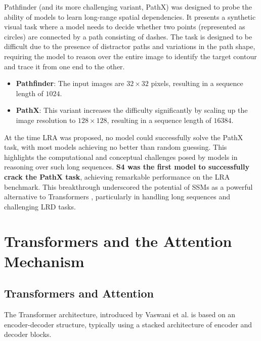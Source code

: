 \documentclass[12pt,a4paper]{report}
\begin{document}
Pathfinder (and its more challenging variant, PathX) was designed to probe the ability of models to learn long-range spatial dependencies. It presents a synthetic visual task where a model needs to decide whether two points (represented as circles) are connected by a path consisting of dashes. The task is designed to be difficult due to the presence of distractor paths and variations in the path shape, requiring the model to reason over the entire image to identify the target contour and trace it from one end to the other.

\begin{itemize}
    \item \textbf{Pathfinder}: The input images are $32 \times 32$ pixels, resulting in a sequence length of $1024$.
    \item \textbf{PathX}: This variant increases the difficulty significantly by scaling up the image resolution to $128 \times 128$, resulting in a sequence length of $16384$.
\end{itemize}

At the time LRA was proposed, no model could successfully solve the PathX task, with most models achieving no better than random guessing. This highlights the computational and conceptual challenges posed by models in reasoning over such long sequences. \textbf{S4 \cite{s4} was the first model to successfully crack the PathX task}, achieving remarkable performance on the LRA benchmark. This breakthrough underscored the potential of SSMs as a powerful alternative to Transformers \cite{transformers}, particularly in handling long sequences and challenging LRD tasks.

\chapter{Transformers and the Attention Mechanism}

\section{Transformers and Attention}

The Transformer architecture, introduced by Vaswani et al. \cite{transformers} is based on an encoder-decoder structure, typically using a stacked architecture of encoder and decoder blocks.
\end{document}
